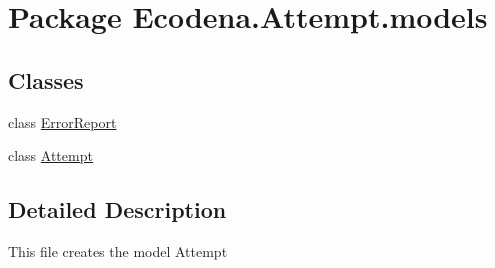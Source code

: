 \hypertarget{namespace_ecodena_1_1_attempt_1_1models}{
\section{Package Ecodena.Attempt.models}
\label{d1/dca/namespace_ecodena_1_1_attempt_1_1models}
}
\subsection*{Classes}
\begin{DoxyCompactItemize}
\item 
class \hyperlink{class_ecodena_1_1_attempt_1_1models_1_1_error_report}{ErrorReport}
\item 
class \hyperlink{class_ecodena_1_1_attempt_1_1models_1_1_attempt}{Attempt}
\end{DoxyCompactItemize}


\subsection{Detailed Description}
\begin{DoxyVerb}This file creates the model Attempt\end{DoxyVerb}
 